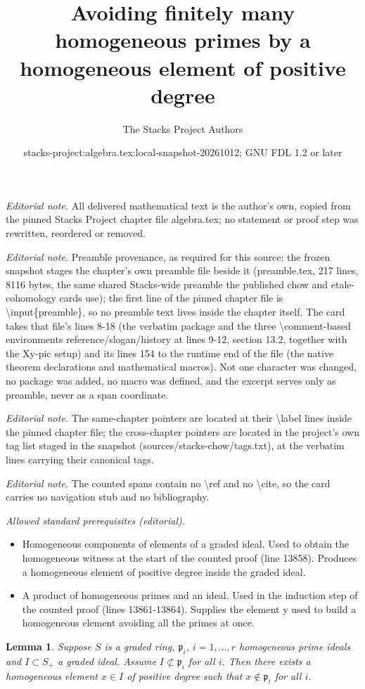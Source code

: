 \documentclass[10pt,a4paper]{amsart}
\title{Avoiding finitely many homogeneous primes by a homogeneous element of positive degree}
\author{The Stacks Project Authors}
\date{stacks-project:algebra.tex:local-snapshot-20261012; GNU FDL 1.2 or later}
\theoremstyle{plain}
\newtheorem{lemma}[subsection]{Lemma}
\theoremstyle{definition}
\theoremstyle{remark}
\numberwithin{equation}{subsection}
\begin{document}
\maketitle
\noindent\textit{Editorial note.} All delivered mathematical text is the author's own, copied from the pinned Stacks Project chapter file algebra.tex; no statement or proof step was rewritten, reordered or removed.\par\medskip
\noindent\textit{Editorial note.} Preamble provenance, as required for this source: the frozen snapshot stages the chapter's own preamble file beside it (preamble.tex, 217 lines, 8116 bytes, the same shared Stacks-wide preamble the published chow and etale-cohomology cards use); the first line of the pinned chapter file is \textbackslash{}input\{preamble\}, so no preamble text lives inside the chapter itself. The card takes that file's lines 8-18 (the verbatim package and the three \textbackslash{}comment-based environments reference/slogan/history at lines 9-12, section 13.2, together with the Xy-pic setup) and its lines 154 to the runtime end of the file (the native theorem declarations and mathematical macros). Not one character was changed, no package was added, no macro was defined, and the excerpt serves only as preamble, never as a span coordinate.\par\medskip
\noindent\textit{Editorial note.} The same-chapter pointers are located at their \textbackslash{}label lines inside the pinned chapter file; the cross-chapter pointers are located in the project's own tag list staged in the snapshot (sources/stacks-chow/tags.txt), at the verbatim lines carrying their canonical tags.\par\medskip
\noindent\textit{Editorial note.} The counted spans contain no \textbackslash{}ref and no \textbackslash{}cite, so the card carries no navigation stub and no bibliography.\par\medskip
\noindent\textit{Allowed standard prerequisites (editorial).}\begin{itemize}
\item Homogeneous components of elements of a graded ideal. Used to obtain the homogeneous witness at the start of the counted proof (line 13858). Produces a homogeneous element of positive degree inside the graded ideal.
\item A product of homogeneous primes and an ideal. Used in the induction step of the counted proof (lines 13861-13864). Supplies the element y used to build a homogeneous element avoiding all the primes at once.
\end{itemize}\medskip
\begin{lemma}
\label{lemma-graded-silly}
Suppose $S$ is a graded ring, $\mathfrak p_i$, $i = 1, \ldots, r$
homogeneous prime ideals and $I \subset S_{+}$ a graded ideal.
Assume $I \not\subset \mathfrak p_i$ for all $i$. Then there
exists a homogeneous element $x\in I$ of positive degree such
that $x\not\in \mathfrak p_i$ for all $i$.
\end{lemma}
\end{document}
